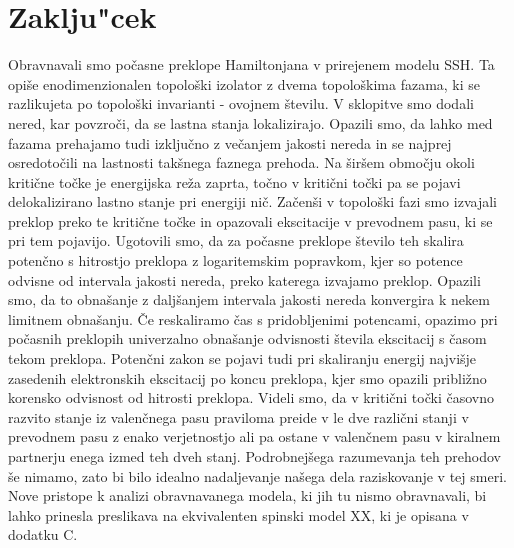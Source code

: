 \chapter{Zaklju"cek}
Obravnavali smo počasne preklope Hamiltonjana v prirejenem modelu SSH. Ta opiše enodimenzionalen topološki izolator z dvema topološkima fazama, ki se razlikujeta po topološki invarianti -  ovojnem številu. V sklopitve smo dodali nered, kar povzroči, da se lastna stanja lokalizirajo. Opazili smo, da lahko med fazama prehajamo tudi izključno z večanjem jakosti nereda in se najprej osredotočili na lastnosti takšnega faznega prehoda. Na širšem območju okoli kritične točke je energijska reža zaprta, točno v kritični točki pa se pojavi delokalizirano lastno stanje pri energiji nič.  
Začenši v topološki fazi smo izvajali preklop preko te kritične točke in opazovali ekscitacije v prevodnem pasu, ki se pri tem pojavijo. Ugotovili smo, da za počasne preklope število teh skalira potenčno s hitrostjo preklopa z logaritemskim popravkom, kjer so potence odvisne od intervala jakosti nereda, preko katerega izvajamo preklop. Opazili smo, da to obnašanje z daljšanjem intervala jakosti nereda konvergira k nekem limitnem obnašanju.
Če reskaliramo čas s pridobljenimi potencami, opazimo pri počasnih preklopih univerzalno obnašanje odvisnosti števila ekscitacij s časom tekom preklopa.
Potenčni zakon se pojavi tudi pri skaliranju energij najvišje zasedenih elektronskih ekscitacij po koncu preklopa, kjer smo opazili približno korensko odvisnost od hitrosti preklopa.
Videli smo, da v kritični točki časovno razvito stanje iz valenčnega pasu praviloma preide v le dve različni stanji v prevodnem pasu z enako verjetnostjo ali pa ostane v valenčnem pasu v kiralnem partnerju enega izmed teh dveh stanj.  Podrobnejšega razumevanja teh prehodov še nimamo, zato bi bilo idealno nadaljevanje našega dela raziskovanje v tej smeri. Nove pristope k analizi obravnavanega modela, ki jih tu nismo obravnavali, bi lahko prinesla preslikava na ekvivalenten spinski model XX, ki je opisana v dodatku C.


